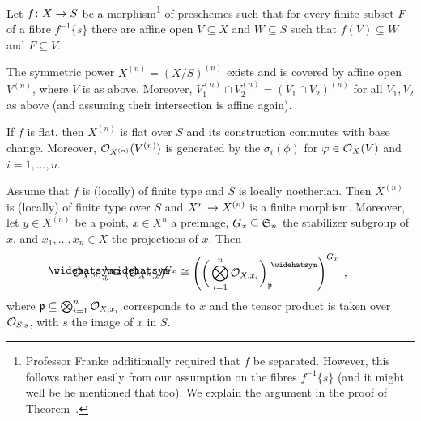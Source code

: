 \documentclass[a4paper,parskip=half,numbers=enddot, DIV=12]{scrreprt}
\begin{document}
\begin{prop}
	Let $f\colon X\morphism S$ be a morphism\footnote{Professor Franke additionally required that $f$ be separated. However, this follows rather easily from our assumption on the fibres $f^{-1}\{s\}$ (and it might well be he mentioned that too). We explain the argument in the proof of Theorem~.} of preschemes such that for every finite subset $F$ of a fibre $f^{-1}\{s\}$ there are affine open $V\subseteq X$ and $W\subseteq S$ such that $f(V)\subseteq W$ and $F\subseteq V$.
	\begin{alphanumerate}
		\item The symmetric power $X^{(n)}=(X/S)^{(n)}$ exists and is covered by affine open $V^{(n)}$, where $V$ is as above. Moreover, $V_1^{(n)}\cap V_2^{(n)}=(V_1\cap V_2)^{(n)}$ for all $V_1,V_2$ as above (and assuming their intersection is affine again).
		\item If $f$ is flat, then $X^{(n)}$ is flat over $S$ and its construction commutes with base change. Moreover, $\mathcal{O}_{X^{(n)}}(V^{(n)})$ is generated by the $\sigma_i(\phi)$ for $\varphi\in\mathcal{O}_X(V)$ and $i=1,\ldots,n$.
		\item Assume that $f$ is (locally) of finite type and $S$ is locally noetherian. Then $X^{(n)}$ is (locally) of finite type over $S$ and $X^n\morphism X^{(n)}$ is a finite morphism. Moreover, let $y\in X^{(n)}$ be a point, $x\in X^n$ a preimage, $G_x\subseteq \mathfrak{S}_n$ the stabilizer subgroup of $x$, and $x_1,\ldots,x_n\in X$ the projections of $x$. Then
		\begin{align*}
			\roof{\Oo}_{X^{(n)},y}\cong (\roof{\Oo}_{X^n,x})^{G_x}\cong \left(\bigg(\bigotimes_{i=1}^n\Oo_{X,x_i}\bigg)_\pp^\complete\right)^{G_x}\;,
		\end{align*}
		where $\mathfrak{p}\subseteq \bigotimes_{i=1}^n\mathcal{O}_{X,x_i}$ corresponds to $x$ and the tensor product is taken over $\mathcal{O}_{S,s}$, with $s$ the image of $x$ in $S$.
	\end{alphanumerate}
\end{prop}
\end{document}
